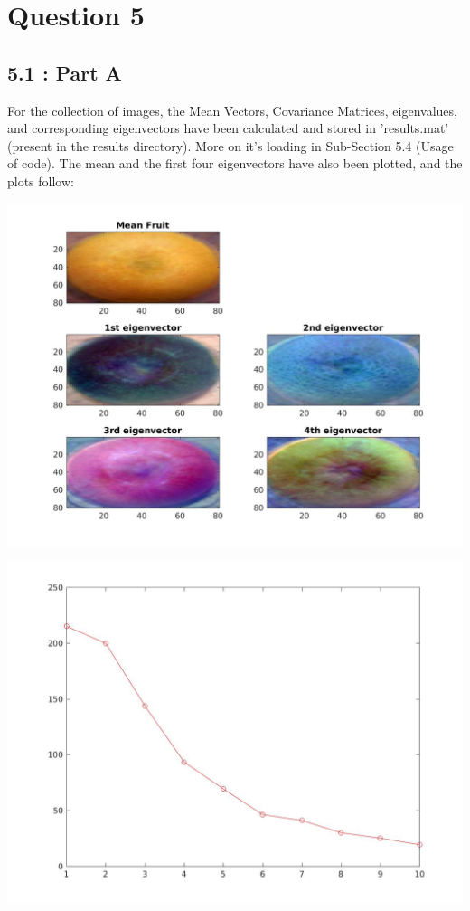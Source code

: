 \documentclass[12pt, a4paper]{article}
\begin{document}
\section*{Question 5}
\subsection*{5.1 : Part A}
\hspace{1cm} For the collection of images, the Mean Vectors, Covariance Matrices, eigenvalues, and corresponding eigenvectors have been calculated and stored in 'results.mat' (present in the results directory). More on it's loading in Sub-Section 5.4 (Usage of code). The mean and the first four eigenvectors have also been plotted, and the plots follow:

\includegraphics[width=\textwidth, height = 0.6\paperheight]{Mean_and_4Eigen}
\begin{minipage}{\linewidth}
\includegraphics[width=\textwidth, height = 0.4\paperheight]{Eigen10}
\end{minipage}
\end{document}
